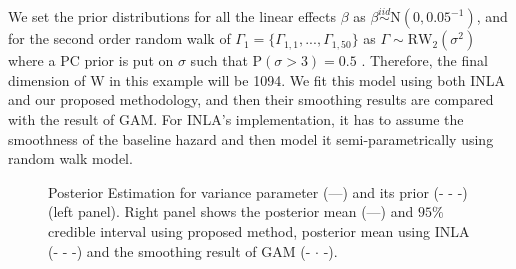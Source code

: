 \documentclass[]{article}
\begin{document}
We set the prior distributions for all the linear effects $\beta$ as $\beta \stackrel{iid}{\sim} \text{N}(0, 0.05^{-1})$, and for the second order random walk of $\Gamma_1 = \{\Gamma_{1,1}, ..., \Gamma_{1,50}\}$ as $\Gamma \sim \text{RW}_2(\sigma^2)$ where a PC prior is put on $\sigma$ such that $\text{P}(\sigma > 3) = 0.5$ \citep{pcprior}. Therefore, the final dimension of W in this example will be 1094. We fit this model using both INLA and our proposed methodology, and then their smoothing results are compared with the result of GAM. For INLA's implementation, it has to assume the smoothness of the baseline hazard and then model it semi-parametrically using random walk model. 

\begin{figure}[ht]
\centering
{}

\caption{Posterior Estimation for variance parameter (---) and its prior (- - -)  (left panel). Right panel shows the posterior mean (---) and $95\%$ credible interval using proposed method, posterior mean using INLA (- - -) and the smoothing result of GAM (- $\cdot$ -).}
\label{fig:leuk}
\end{figure}
\end{document}
